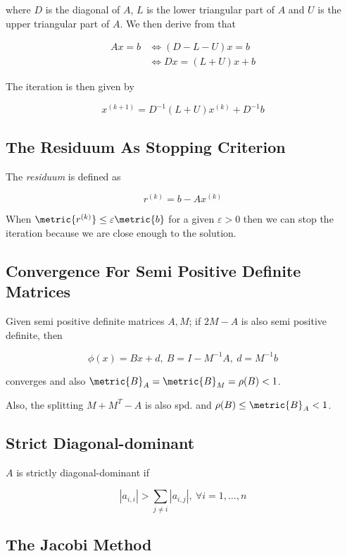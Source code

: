 where \(D\) is the diagonal of \(A\), \(L\) is the lower triangular part of \(A\) and \(U\) is the upper triangular part of \(A\). 
We then derive from that 

\begin{align*}
    Ax = b &\iff (D - L - U)x = b \\ 
           &\iff Dx = (L + U)x + b
\end{align*}

The iteration is then given by

\[
    x^{(k + 1)} = D^{-1}(L + U)x^{(k)} + D^{-1}b
\]

\subsection{The Residuum As Stopping Criterion}

The \emph{residuum} is defined as

\[
    r^{(k)} = b - Ax^{(k)}
\]

When \(\metric{r^{(k)}} \le \varepsilon \metric{b}\) for a given \(\varepsilon > 0\) then we can stop the iteration because we are close enough to the solution.

\subsection{Convergence For Semi Positive Definite Matrices}

Given semi positive definite matrices \(A, M\); if \(2M - A\) is also semi positive definite, then 

\[
    \phi(x) = Bx + d,\ B = I - M^{-1}A, \ d = M^{-1}b
\]

converges and also \(\metric{B}_A = \metric{B}_M = \rho(B) < 1\).

Also, the splitting \(M + M^T - A\) is also spd. and \(\rho(B) \le \metric{B}_A < 1\).

\subsection{Strict Diagonal-dominant}

\(A\) is strictly diagonal-dominant if 

\[
    |a_{i,i}| > \sum_{j \ne i} |a_{i,j}|, \ \forall i = 1, \dots, n
\]

\subsection{The Jacobi Method}

